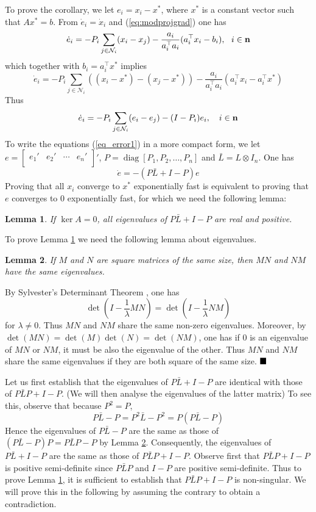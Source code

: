 \documentclass{aims}
\newtheorem{lem}{\textbf{Lemma}}
\def\eq#1{\begin{equation}#1\end{equation}}
\def\n{{\bf n}}
\def\qed{ \rule{.1in}{.1in}}
\begin{document}
\bigskip


To prove the corollary, we let $e_i=x_i-x^*$, where $x^*$ is a constant vector such that $Ax^*=b$. From $\dot{e}_i=\dot{x}_i$ and (\ref{eq:modprojgrad}) one has
 \begin{equation}\label{eq_erro0}
\dot e_i=-P_i\sum_{j\in \mathcal N_i}(x_i-x_j)-\frac{a_i}{a_i^{\top}a_i}(a_i^{\top}x_i-b_i),\ \ i\in \n
\end{equation} which together with $b_i=a_i^{\top}x^*$ implies $$\dot e_i=-P_i\sum_{j\in \mathcal N_i}\left((x_i-x^*)-(x_j-x^*)\right)-\frac{a_i}{a_i^{\top}a_i}(a_i^{\top}x_i-a_i^{\top}x^*)$$ Thus \eq{\label{eq_error1}\dot e_i=-P_i\sum_{j\in \mathcal N_i}(e_i-e_j)-(I-P_i)e_i, \quad i\in \n}
To write the equations (\ref{eq_error1}) in a more compact form, we let $e=\left[
                                   \begin{array}{cccc}
                                     e_1' & e_2' & \cdots & e_n' \\
                                   \end{array}
                                 \right]'
$, $P=\operatorname{diag}[P_1,P_2,\dots, P_n]$ and $\bar L=L\otimes I_n$. One has \eq{\label{eq_error2}\dot e=-(P\bar{L}+I-P)e} Proving that all $x_i$ converge to $x^*$ exponentially fast is equivalent to proving that $e$ converges to 0 exponentially fast, for which we need the following lemma:
\begin{lem}\label{Lem_eig} If $\ker A=0$, all eigenvalues of $P\bar{L}+I-P$ are real and positive.
\end{lem}

To prove Lemma \ref{Lem_eig} we need the following lemma about eigenvalues.
\begin{lem}\label{Lem_eigP}
If $M$ and $N$ are square matrices of the same size, then $MN$ and $NM$ have the same eigenvalues.
\end{lem}
 By Sylvester's Determinant Theorem \cite{Syl51}, one has \eq{\det(I-\frac{1}{\lambda}MN)=\det( I-\frac{1}{\lambda}NM)} for $\lambda\neq 0$. Thus $MN$ and $NM$ share the same non-zero eigenvalues. Moreover, by $\det(MN)=\det(M)\det(N)=\det(NM)$, one has if $0$ is an eigenvalue of $MN$ or $NM$, it must be also the eigenvalue of the other. Thus $MN$ and $NM$ share the same eigenvalues if they are both square of the same size. $\qed$

 Let us first establish that the eigenvalues of $P\bar L+I-P$ are identical with those of $P\bar LP+I-P.$ (We will then analyse the eigenvalues of the latter matrix) To see this, observe that because $P^2=P$, $$P\bar L-P=P^2\bar L-P^2  =P(P\bar L-P)$$
Hence the eigenvalues of $P\bar L-P$ are the same as those of $(P\bar L-P)P=P\bar L P-P$ by Lemma \ref{Lem_eigP}. Consequently, the eigenvalues of $P\bar L+I-P$ are the same as those of $P\bar LP+I-P$. Observe first that $P\bar LP+I-P$ is positive semi-definite since $P\bar L P$ and $I-P$ are positive semi-definite. Thus to prove Lemma \ref{Lem_eig}, it is sufficient to establish that $P\bar LP+I-P$ is non-singular. We will prove this in the following by assuming the contrary to obtain a contradiction.
\end{document}
